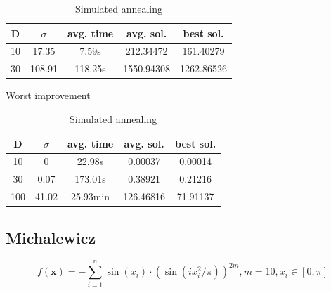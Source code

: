 \documentclass{article}
\begin{document}
\begin{table}[!htbp]
\begin{minipage}{.4\linewidth}
    \centering

    \begin{tabular}{|c|c|c|c|c|}
    \hline
    D   & $\sigma$  & avg. time     & avg. sol.     & best sol. \\
    \hline
    10  & 17.35     & 7.59s         & 212.34472     & 161.40279 \\
    \hline
    30  & 108.91    & 118.25s       & 1550.94308    & 1262.86526 \\
    \hline
    \end{tabular}
    \caption{Worst improvement}
  \end{minipage}%
  \quad %
  \begin{minipage}{.75\linewidth}
    \centering

    \begin{tabular}{|c|c|c|c|c|}
    \hline
    D   & $\sigma$  & avg. time     & avg. sol.     & best sol. \\
    \hline
    10  & 0         & 22.98s        & 0.00037       & 0.00014 \\
    \hline
    30  & 0.07      & 173.01s       & 0.38921       & 0.21216 \\
    \hline
    100 & 41.02     & 25.93min      & 126.46816     & 71.91137 \\
    \hline
    \end{tabular}
    \caption{Simulated annealing}
  \end{minipage}
\end{table}

\newpage
\setcounter{table}{0}


\subsection{Michalewicz}
$$f(\mathbf{x}) = -\sum_{i=1}^{n} \sin(x_i) \cdot \left(\sin\left(ix_i^2 / \pi\right)\right)^{2m} , m = 10, x_i \in \left[0,\pi\right]$$

\end{document}
